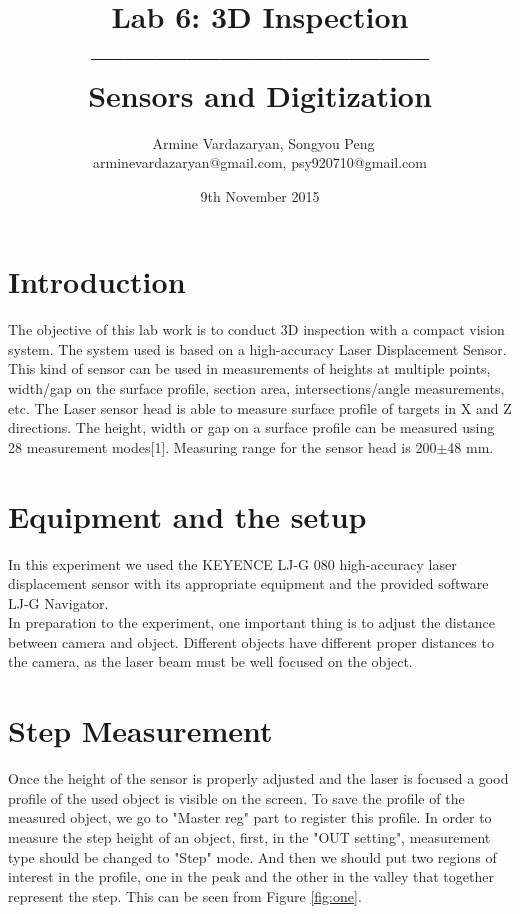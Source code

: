 \documentclass[english]{article}
\begin{document}
\title{Lab 6: 3D Inspection\\ -------------------------------- \\ \Large Sensors and Digitization}
\author{ \ Armine Vardazaryan, Songyou Peng \\ arminevardazaryan@gmail.com, psy920710@gmail.com}
\date{9th November 2015}

\maketitle

\section*{Introduction}
The objective of this lab work is to conduct 3D inspection with a compact vision system. The system used is based on a high-accuracy Laser Displacement Sensor.
This kind of sensor can be used in measurements of heights at multiple points, width/gap on the surface profile, section area, intersections/angle measurements, etc. The Laser sensor head is able to measure surface profile of targets in X and Z directions. The height, width or gap on a surface profile can be measured using 28 measurement modes[1].
Measuring range for the sensor head is 200$\pm$48 mm.

\section*{Equipment and the setup}
In this experiment we used the KEYENCE LJ-G 080 high-accuracy laser displacement sensor with its appropriate equipment and the provided software LJ-G Navigator.\\
In preparation to the experiment, one important thing is to adjust the distance between camera and object. Different objects have different proper distances to the camera, as the laser beam must be well focused on the object. \\

\section*{Step Measurement}
Once the height of the sensor is properly adjusted and the laser is focused a good profile of the used object is visible on the screen. To save the profile of the measured object, we go to "Master reg" part to register this profile. In order to measure the step height of an object, first, in the "OUT setting", measurement type should be changed to "Step" mode. And then we should put two regions of interest in the profile, one in the peak and the other in the valley that together represent the step. This can be seen from Figure \ref{fig:one}.\\
\end{document}
